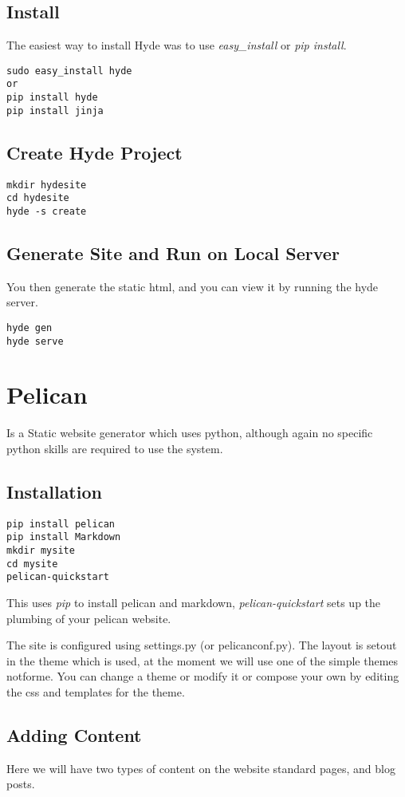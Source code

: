 \documentclass[12pt]{article}			%
\begin{document}
\subsection{Install}
The easiest way to install Hyde was to use \textit{easy\_install} or \textit{pip install}.
\begin{verbatim}
sudo easy_install hyde
or
pip install hyde
pip install jinja
\end{verbatim}

\subsection{Create Hyde Project}
\begin{verbatim}
mkdir hydesite
cd hydesite
hyde -s create

\end{verbatim}

\subsection{Generate Site and Run on Local Server}
You then generate the static html, and you can view it by running the hyde server.
\begin{verbatim}
hyde gen
hyde serve
\end{verbatim}

\newpage
\section{Pelican}
Is a Static website generator which uses python, although again no specific python skills are required to use the system.
\subsection{Installation}
\begin{verbatim}
pip install pelican
pip install Markdown
mkdir mysite
cd mysite
pelican-quickstart
\end{verbatim}
This uses \textit{pip} to install pelican and markdown, \textit{pelican-quickstart} sets up the plumbing of your pelican website.\par
The site is configured using settings.py (or pelicanconf.py).
The layout is setout in the theme which is used, at the moment we will use one of the simple themes notforme. You can change a theme or modify it or compose your own by editing the css and templates for the theme.
\subsection{Adding Content}
Here we will have two types of content on the website standard pages, and blog posts.
\end{document}
